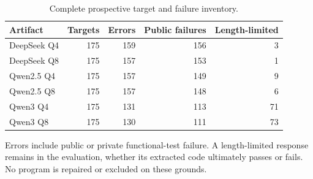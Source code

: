 \begin{table}[htbp]
\centering
\caption{Complete prospective target and failure inventory.}
\label{tab:validation-inventory}
\small
\begin{tabular}{lrrrr}
\toprule
Artifact & Targets & Errors & Public failures & Length-limited \\
\midrule
DeepSeek Q4 & 175 & 159 & 156 & 3 \\
DeepSeek Q8 & 175 & 157 & 153 & 1 \\
Qwen2.5 Q4 & 175 & 157 & 149 & 9 \\
Qwen2.5 Q8 & 175 & 157 & 148 & 6 \\
Qwen3 Q4 & 175 & 131 & 113 & 71 \\
Qwen3 Q8 & 175 & 130 & 111 & 73 \\
\bottomrule
\end{tabular}
\par\vspace{4pt}\begin{minipage}{0.98\linewidth}\footnotesize Errors include public or private functional-test failure. A length-limited response remains in the evaluation, whether its extracted code ultimately passes or fails. No program is repaired or excluded on these grounds.\end{minipage}
\end{table}
